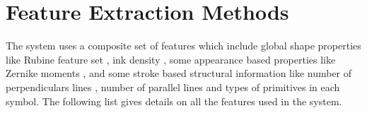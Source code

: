 %
%

\section{Feature Extraction Methods}%
\label{sec:FeatureExtraction}

The system uses a composite set of features which include global shape properties like Rubine feature set \cite{gestureexample12},  ink density \cite{GeometryAndDomain102}, some appearance based properties like Zernike moments \cite{HeloiseBeautification}, and some stroke based structural information like number of perpendiculars lines , number of parallel lines and types of primitives in each symbol. The following list gives details on all the features used in the system.
